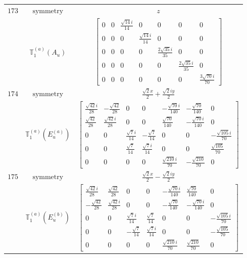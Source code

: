 \documentclass[fleqn,8pt,landscape]{jsarticle}
\begin{document}
\begin{longtable}{ccc}
$ 173 $ & $ \text{symmetry} $ & $ z $ \\
$  $ & $ \mathbb{T}_{1}^{(a)}(A_{u}) $ & $ \begin{bmatrix} 0 & 0 & \frac{\sqrt{14} i}{14} & 0 & 0 & 0 & 0 \\ 0 & 0 & 0 & \frac{\sqrt{14} i}{14} & 0 & 0 & 0 \\ 0 & 0 & 0 & 0 & \frac{2 \sqrt{35} i}{35} & 0 & 0 \\ 0 & 0 & 0 & 0 & 0 & \frac{2 \sqrt{35} i}{35} & 0 \\ 0 & 0 & 0 & 0 & 0 & 0 & \frac{3 \sqrt{70} i}{70} \end{bmatrix} $ \\ \hline
$ 174 $ & $ \text{symmetry} $ & $ \frac{\sqrt{2} x}{2} + \frac{\sqrt{2} i y}{2} $ \\
$  $ & $ \mathbb{T}_{1}^{(a)}(E_{u}^{(a)}) $ & $ \begin{bmatrix} \frac{\sqrt{42} i}{28} & - \frac{\sqrt{42}}{28} & 0 & 0 & - \frac{\sqrt{70} i}{140} & - \frac{\sqrt{70}}{140} & 0 \\ \frac{\sqrt{42}}{28} & \frac{\sqrt{42} i}{28} & 0 & 0 & \frac{\sqrt{70}}{140} & - \frac{\sqrt{70} i}{140} & 0 \\ 0 & 0 & \frac{\sqrt{7} i}{14} & - \frac{\sqrt{7}}{14} & 0 & 0 & - \frac{\sqrt{105} i}{70} \\ 0 & 0 & \frac{\sqrt{7}}{14} & \frac{\sqrt{7} i}{14} & 0 & 0 & \frac{\sqrt{105}}{70} \\ 0 & 0 & 0 & 0 & \frac{\sqrt{210} i}{70} & - \frac{\sqrt{210}}{70} & 0 \end{bmatrix} $ \\ \hline
$ 175 $ & $ \text{symmetry} $ & $ \frac{\sqrt{2} x}{2} - \frac{\sqrt{2} i y}{2} $ \\
$  $ & $ \mathbb{T}_{1}^{(a)}(E_{u}^{(b)}) $ & $ \begin{bmatrix} \frac{\sqrt{42} i}{28} & \frac{\sqrt{42}}{28} & 0 & 0 & - \frac{\sqrt{70} i}{140} & \frac{\sqrt{70}}{140} & 0 \\ - \frac{\sqrt{42}}{28} & \frac{\sqrt{42} i}{28} & 0 & 0 & - \frac{\sqrt{70}}{140} & - \frac{\sqrt{70} i}{140} & 0 \\ 0 & 0 & \frac{\sqrt{7} i}{14} & \frac{\sqrt{7}}{14} & 0 & 0 & - \frac{\sqrt{105} i}{70} \\ 0 & 0 & - \frac{\sqrt{7}}{14} & \frac{\sqrt{7} i}{14} & 0 & 0 & - \frac{\sqrt{105}}{70} \\ 0 & 0 & 0 & 0 & \frac{\sqrt{210} i}{70} & \frac{\sqrt{210}}{70} & 0 \end{bmatrix} $ \\ \hline

\end{longtable}
\end{document}
